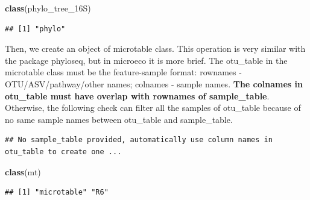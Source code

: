 \documentclass[
]{book}
\newenvironment{Shaded}{\begin{snugshade}}{\end{snugshade}}
\newcommand{\AttributeTok}[1]{\textcolor[rgb]{0.13,0.29,0.53}{#1}}
\newcommand{\CommentTok}[1]{\textcolor[rgb]{0.56,0.35,0.01}{\textit{#1}}}
\newcommand{\FunctionTok}[1]{\textcolor[rgb]{0.13,0.29,0.53}{\textbf{#1}}}
\newcommand{\NormalTok}[1]{#1}
\newcommand{\OtherTok}[1]{\textcolor[rgb]{0.56,0.35,0.01}{#1}}
\newcommand{\SpecialCharTok}[1]{\textcolor[rgb]{0.81,0.36,0.00}{\textbf{#1}}}
\begin{document}
\begin{Shaded}
\begin{Highlighting}[]
\FunctionTok{class}\NormalTok{(phylo\_tree\_16S)}
\end{Highlighting}
\end{Shaded}

\begin{verbatim}
## [1] "phylo"
\end{verbatim}

Then, we create an object of microtable class.
This operation is very similar with the package phyloseq\citep{Mcmurdie_phyloseq_2013}, but in microeco it is more brief.
The otu\_table in the microtable class must be the feature-sample format: rownames - OTU/ASV/pathway/other names; colnames - sample names.
\textbf{The colnames in otu\_table must have overlap with rownames of sample\_table}.
Otherwise, the following check can filter all the samples of otu\_table because of no same sample names between otu\_table and sample\_table.

\begin{Shaded}
\end{Shaded}

\begin{verbatim}
## No sample_table provided, automatically use column names in otu_table to create one ...
\end{verbatim}

\begin{Shaded}
\begin{Highlighting}[]
\FunctionTok{class}\NormalTok{(mt)}
\end{Highlighting}
\end{Shaded}

\begin{verbatim}
## [1] "microtable" "R6"
\end{verbatim}

\begin{Shaded}
\end{Shaded}
\end{document}
